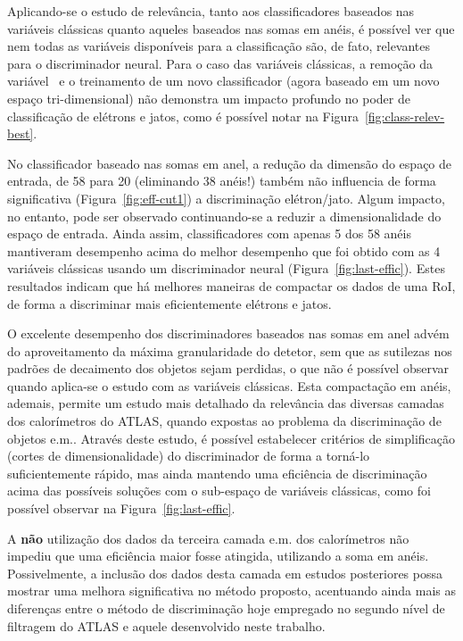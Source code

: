 Aplicando-se o estudo de rele\-vân\-cia, tanto aos classificadores baseados nas
vari\-á\-veis clás\-sicas quanto aqueles baseados nas somas em a\-néis, é
pos\-sí\-vel ver que nem todas as vari\-á\-veis dispo\-ní\-veis para a
classifica\-ção são, de fato, relevantes para o discriminador neural. Para o
caso das variáveis clássicas, a remoção da variável \eratio\ e o treinamento de
um novo classificador (agora baseado em um novo espaço tri-dimensional) não
demonstra um impacto profundo no poder de classificação de elétrons e jatos,
como é possível notar na Figura~\ref{fig:class-relev-best}.

No classificador baseado nas somas em anel, a redução da dimensão do espaço de
entrada, de 58 para 20 (eliminando 38 anéis!) também não influencia de forma
significativa (Figura~\ref{fig:eff-cut1}) a discriminação elétron/jato. Algum
impacto, no entanto, pode ser observado continuando-se a reduzir a
dimensionalidade do espaço de entrada. Ainda assim, classificadores com apenas
5 dos 58 anéis mantiveram desempenho acima do melhor desempenho que foi obtido
com as 4 variáveis clássicas usando um discriminador neural
(Figura~\ref{fig:last-effic}). Estes resultados indicam que há melhores
maneiras de compactar os dados de uma RoI, de forma a discriminar mais
eficientemente elétrons e jatos.

O excelente desempenho dos discriminadores baseados nas somas em anel advém do
aproveitamento da máxima granularidade do detetor, sem que as sutilezas nos
padrões de decaimento dos objetos sejam perdidas, o que não é possível observar
quando aplica-se o estudo com as variáveis clássicas. Esta compactação em
anéis, ademais, permite um estudo mais detalhado da relevância das diversas
camadas dos calorímetros do ATLAS, quando expostas ao problema da discriminação
de objetos e.m.. Através deste estudo, é possível estabelecer critérios de
simplificação (cortes de dimensionalidade) do discriminador de forma a torná-lo
suficientemente rápido, mas ainda mantendo uma eficiência de discriminação
acima das possíveis soluções com o sub-espaço de variáveis clássicas, como foi
possível observar na Figura~\ref{fig:last-effic}.

A \textbf{não} utilização dos dados da terceira camada e.m. dos calorímetros
não impediu que uma eficiência maior fosse atingida, utilizando a soma em
anéis. Possivelmente, a inclusão dos dados desta camada em estudos posteriores
possa mostrar uma melhora significativa no método proposto, acentuando ainda
mais as diferenças entre o método de discriminação hoje empregado no segundo
nível de filtragem do ATLAS e aquele desenvolvido neste trabalho.

